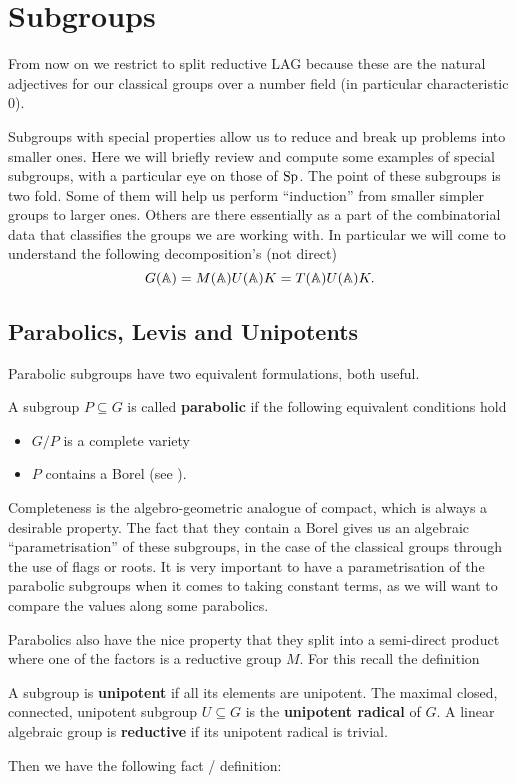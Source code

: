 \section{Subgroups}
From now on we restrict to split reductive LAG because these are the natural adjectives for our classical groups over a number field (in particular characteristic 0).

Subgroups with special properties allow us to reduce and break up problems into smaller ones. Here we will briefly review and compute some examples of special subgroups, with a particular eye on those of \(\operatorname{Sp}\). The point of these subgroups is two fold. Some of them will help us perform ``induction'' from smaller simpler groups to larger ones. Others are there essentially as a part of the combinatorial data that classifies the groups we are working with. In particular we will come to understand the following decomposition's (not direct)
\[G(\A) = M(\A)U(\A) K = T(\A)U(\A)K.\]

\subsection{Parabolics, Levis and Unipotents}
Parabolic subgroups have two equivalent formulations, both useful.
\begin{definition}
    A subgroup \(P\subseteq G\) is called \textbf{parabolic} if the following equivalent conditions hold
    \begin{itemize}
        \item \(G/P\) is a complete variety
        \item \(P\) contains a Borel (see ).
    \end{itemize}
\end{definition}

Completeness is the algebro-geometric analogue of compact, which is always a desirable property. The fact that they contain a Borel gives us an algebraic ``parametrisation'' of these subgroups, in the case of the classical groups through the use of flags or roots. It is very important to have a parametrisation of the parabolic subgroups when it comes to taking constant terms, as we will want to compare the values along some parabolics.

Parabolics also have the nice property that they split into a semi-direct product 
where one of the factors is a reductive group \(M\). For this recall the definition
\begin{definition}\label{unipotent_radical_definition}
    A subgroup is \textbf{unipotent} if all its elements are unipotent.
    The maximal closed, connected, unipotent subgroup \(U\subseteq G\) is the \textbf{unipotent radical} of \(G\). A linear algebraic group is \textbf{reductive} if its unipotent radical is trivial.
\end{definition}
Then we have the following fact / definition:

